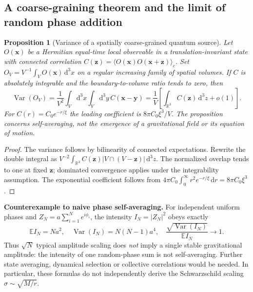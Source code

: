 \documentclass[11pt,a4paper]{article}
\newcommand{\dd}{\mathrm d}
\newtheorem{proposition}{Proposition}[section]
\begin{document}
\subsection{A coarse-graining theorem and the limit of random phase addition}\label{sec:qgd-lln-lemma}
\begin{proposition}[Variance of a spatially coarse-grained quantum source]\label{prop:qgd-lln}
Let $O(\bm x)$ be a Hermitian equal-time local observable in a translation-invariant state with connected correlation $C(\bm z)=\langle O(\bm x)O(\bm x+\bm z)\rangle_c$.  Set $O_V=V^{-1}\int_V O(\bm x)\,\dd^3x$ on a regular increasing family of spatial volumes.  If $C$ is absolutely integrable and the boundary-to-volume ratio tends to zero, then
\begin{equation}\label{eq:qgd-lln}
\operatorname{Var}(O_V)=\frac1{V^2}\int_V\!\dd^3x\int_V\!\dd^3y\,C(\bm x-\bm y)
=\frac1V\left[\int_{\mathbb R^3}C(\bm z)\,\dd^3z+o(1)\right].
\end{equation}
For $C(r)=C_0e^{-r/\xi}$ the leading coefficient is $8\pi C_0\xi^3/V$.  The proposition concerns \emph{self-averaging}, not the emergence of a gravitational field or its equation of motion.
\end{proposition}
\begin{proof}
The variance follows by bilinearity of connected expectations.  Rewrite the double integral as $V^{-2}\int_{\mathbb R^3}\!C(\bm z)|V\cap(V-\bm z)|\,\dd^3z$.  The normalized overlap tends to one at fixed $\bm z$; dominated convergence applies under the integrability assumption.  The exponential coefficient follows from $4\pi C_0\int_0^\infty r^2e^{-r/\xi}\,\dd r=8\pi C_0\xi^3$.
\end{proof}
\noindent\textbf{Counterexample to naive phase self-averaging.}
For independent uniform phases and $Z_N=a\sum_{i=1}^N e^{i\phi_i}$, the intensity $I_N=|Z_N|^2$ obeys exactly
\begin{equation}\label{eq:qgd-randomphase}
\mathbb E I_N=Na^2,\quad \operatorname{Var}(I_N)=N(N-1)a^4,\quad
\frac{\sqrt{\operatorname{Var}(I_N)}}{\mathbb E I_N}\to1.
\end{equation}
Thus $\sqrt N$ typical amplitude scaling does \emph{not} imply a single stable gravitational amplitude: the intensity of one random-phase sum is not self-averaging.  Further state averaging, dynamical selection or collective correlations would be needed. In particular, these formulas do not independently derive the Schwarzschild scaling $\sigma\sim\sqrt{M/r}$.
\end{document}
